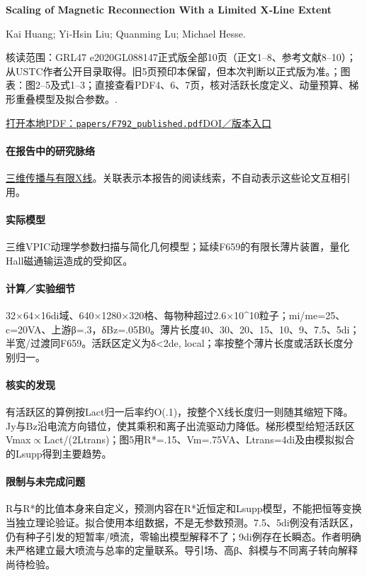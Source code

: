 \textbf{Scaling of Magnetic Reconnection With a Limited X‐Line Extent}\citep{F792}\

Kai Huang;  Yi‐Hsin Liu;  Quanming Lu;  Michael Hesse.

\textsf{核读范围：}GRL47 e2020GL088147正式版全部10页（正文1–8、参考文献8–10）；从USTC作者公开目录取得。旧5页预印本保留，但本次判断以正式版为准。；\textsf{图表：}图2–5及式1–3；直接查看PDF4、6、7页，核对活跃长度定义、动量预算、梯形重叠模型及拟合参数。.

\href{run:papers/F792_published.pdf}{打开本地PDF：\texttt{papers/F792\_published.pdf}}\quad\href{https://doi.org/10.1029/2020gl088147}{DOI／版本入口}

\paragraph{在报告中的研究脉络}\hyperref[story:three]{三维传播与有限X线}。关联表示本报告的阅读线索，不自动表示这些论文互相引用。

\paragraph{实际模型}三维VPIC动理学参数扫描与简化几何模型；延续F659的有限长薄片装置，量化Hall磁通输运造成的受抑区。

\paragraph{计算／实验细节}32×64×16di域、640×1280×320格、每物种超过2.6×10\textasciicircum{}10粒子；mi/me=25、c=20VA、上游β=.3，δBz=.05B0。薄片长度40、30、20、15、10、9、7.5、5di；半宽/过渡同F659。活跃区定义为δ<2de, local；率按整个薄片长度或活跃长度分别归一。

\paragraph{核实的发现}有活跃区的算例按Lact归一后率约O(.1)，按整个X线长度归一则随其缩短下降。Jy与Bz沿电流方向错位，使其乘积和离子出流驱动力降低。梯形模型给短活跃区Vmax\ensuremath{\propto}Lact/(2Ltrans)；图5用R*=.15、Vm=.75VA、Ltrans=4di及由模拟拟合的Lsupp得到主要趋势。

\paragraph{限制与未完成问题}R与R*的比值本身来自定义，预测内容在R*近恒定和Lsupp模型，不能把恒等变换当独立理论验证。拟合使用本组数据，不是无参数预测。7.5、5di例没有活跃区，仍有种子引发的短暂率/喷流，零输出模型解释不了；9di例存在长瞬态。作者明确未严格建立最大喷流与总率的定量联系。导引场、高β、斜模与不同离子转向解释尚待检验。

